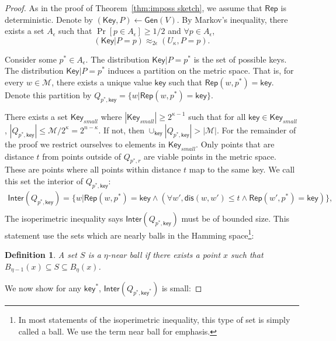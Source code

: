\documentclass[11pt]{article}
\newtheorem{definition}[theorem]{Definition}
\newcommand{\thref}[1]{\mbox{Theorem~\ref{#1}}}
\newcommand{\class}[1]{{\ensuremath{\mathsf{#1}}}}
\newcommand{\key}{\ensuremath{\class{key}}\xspace}
\newcommand{\Key}{\ensuremath{\class{Key}}\xspace}
\newcommand{\gen}{\ensuremath{\class{Gen}}\xspace}
\newcommand{\rep}{\ensuremath{\class{Rep}}\xspace}
\newcommand{\rec}{\ensuremath{\class{Rec}}\xspace}
\newcommand{\crust}{\ensuremath{\class{Crust}}\xspace}
\newcommand{\inter}{\ensuremath{\class{Inter}}\xspace}
\newcommand{\dis}{\ensuremath{\mathsf{dis}}}
\begin{document}
\begin{proof}
As in the proof of \thref{thm:imposs sketch}, we assume that $\rep$ is deterministic.  Denote by $(\Key, P) \leftarrow \gen(V)$.
By Markov's inequality, there exists a set $A_{\epsilon}$ such that $\Pr[p\in A_{\epsilon}]\ge 1/2$ and $\forall p\in A_{\epsilon}$, 
\[
(\Key |P =p) \approx_{2\epsilon} (U_\kappa , P =p).
\]

Consider some $p^*\in A_{\epsilon}$.  
The distribution $\Key|P=p^*$ is the set of possible keys.
The distribution $\Key|P=p^*$ induces a partition on the metric space.  That is, for every $w\in\mathcal{M}$, there exists a unique value $\key$ such that $\rep(w, p^*) =\key$.  Denote this partition by $Q_{p^*,\key} = \{w | \rep(w, p^*) = \key\}$.  

There exists a set $\Key_{small}$  where $|\Key_{small} | \ge 2^{\kappa-1}$ such that for all $\key\in \Key_{small}$,  $|Q_{p^*, \key}|\le \mathcal{M}/2^{\kappa} = 2^{n-\kappa }$.  If not, then $\cup_{\key} |Q_{p^*, \key}| > |\mathcal{M}|$.
For the remainder of the proof we restrict ourselves to elements in $\Key_{small}$.  Only points that are distance $t$ from points outside of $Q_{p^*, r}$ are viable points in the metric space.  These are points where all points within distance $t$ map to the same key.  We call this set the interior of $Q_{p^*, \key}$: 
\begin{align*}
\inter(Q_{p^*, \key}) = \{w | \rep(w, p^*) = \key \wedge (\forall w', \dis(w, w') \le t \wedge \rep(w', p^*) =\key)\},\\
\end{align*}
 The isoperimetric inequality says $\inter(Q_{p^*, \key})$ must be of bounded size.  This statement use the sets which are nearly balls in the Hamming space\footnote{In most statements of the isoperimetric inequality, this type of set is simply called a ball.  We use the term near ball for emphasis.}:
\begin{definition}
A set $S$ is a $\eta$-near ball if there exists a point $x$ such that $B_{\eta-1}(x) \subseteq S \subseteq B_{\eta}(x)$.
\end{definition}
\noindent
We now show for any $\key^*$, $\inter(Q_{p^*, \key^*})$ is small:


\end{proof}
\end{document}
